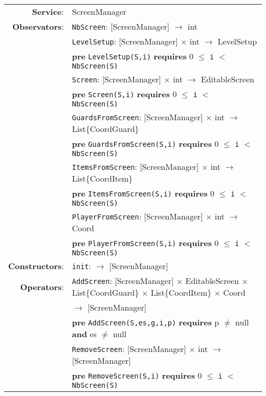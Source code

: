 \documentclass[7pt]{article}
\begin{document}
\begin{tabular}{rl}
\textbf{Service}: & \textrm{ScreenManager}  \\
\textbf{Observators}: & \texttt{NbScreen}: \textrm{[ScreenManager]} $\rightarrow$ \textrm{int} \\
& \texttt{LevelSetup}: \textrm{[ScreenManager]} $\times$ \textrm{int} $\rightarrow$ \textrm{LevelSetup} \\
& \quad \textbf{pre } \texttt{LevelSetup(S,i)} \textbf{ requires } 0 $\leq$ \texttt{i} $<$ \texttt{NbScreen(S)}\\
& \texttt{Screen}: \textrm{[ScreenManager]} $\times$ \textrm{int} $\rightarrow$ \textrm{EditableScreen} \\
& \quad \textbf{pre } \texttt{Screen(S,i)} \textbf{ requires } 0 $\leq$ \texttt{i} $<$ \texttt{NbScreen(S)}\\
& \texttt{GuardsFromScreen}: \textrm{[ScreenManager]} $\times$ \textrm{int} $\rightarrow$ \textrm{List\{CoordGuard\}} \\
& \quad \textbf{pre } \texttt{GuardsFromScreen(S,i)} \textbf{ requires } 0 $\leq$ \texttt{i} $<$ \texttt{NbScreen(S)}\\
& \texttt{ItemsFromScreen}: \textrm{[ScreenManager]} $\times$ \textrm{int} $\rightarrow$ \textrm{List\{CoordItem\}} \\
& \quad \textbf{pre } \texttt{ItemsFromScreen(S,i)} \textbf{ requires } 0 $\leq$ \texttt{i} $<$ \texttt{NbScreen(S)}\\
& \texttt{PlayerFromScreen}: \textrm{[ScreenManager]} $\times$ \textrm{int} $\rightarrow$ \textrm{Coord} \\
& \quad \textbf{pre } \texttt{PlayerFromScreen(S,i)} \textbf{ requires } 0 $\leq$ \texttt{i} $<$ \texttt{NbScreen(S)}\\
\textbf{Constructors}: & \texttt{init}: $\rightarrow$ \textrm{[ScreenManager]} \\
\textbf{Operators}: & \texttt{AddScreen}: \textrm{[ScreenManager]} $\times$ \textrm{EditableScreen} $\times$ \textrm{List\{CoordGuard\}}   $\times$ \textrm{List\{CoordItem\}} $\times$  \textrm{Coord} \\
& \quad\quad\quad $\rightarrow$ \textrm{[ScreenManager]} \\
& \quad \textbf{pre } \texttt{AddScreen(S,es,g,i,p)} \textbf{ requires } p $\neq$ null \textbf{and} es $\neq$ null \\
& \texttt{RemoveScreen}: \textrm{[ScreenManager]} $\times$ \textrm{int}  $\rightarrow$ \textrm{[ScreenManager]} \\
& \quad \textbf{pre } \texttt{RemoveScreen(S,i)} \textbf{ requires } 0 $\leq$ \texttt{i} $<$ \texttt{NbScreen(S)} \\


\end{tabular}
\end{document}
